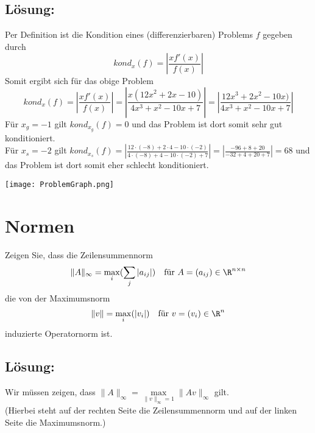 \subsection*{Lösung:}
Per Definition ist die Kondition eines (differenzierbaren) Problems $f$ gegeben durch
$$
kond_x(f)=\left|\frac{xf'(x)}{f(x)}\right|
$$
Somit ergibt sich für das obige Problem
$$
kond_x(f)=\left|\frac{xf'(x)}{f(x)}\right|=\left|\frac{x(12x^2+2x-10)}{4x^3+x^2-10x+7}\right|=\left|\frac{12x^3+2x^2-10x)}{4x^3+x^2-10x+7}\right|
$$
Für $x_g=-1$ gilt $kond_{x_g}(f)=0$ und das Problem ist dort somit sehr gut konditioniert.\\ Für $x_s=-2$ gilt $kond_{x_s}(f)=\left|\frac{12\cdot(-8)+2\cdot4-10\cdot (-2)}{4\cdot (-8)+4-10\cdot(-2)+7}\right|=\left|\frac{-96+8+20}{-32+4+20+7}\right|=68$ und das Problem ist dort somit eher schlecht konditioniert.\\
\begin{center}
\texttt{[image: ProblemGraph.png]}
\end{center}
\newpage

\section{Normen}
Zeigen Sie, dass die Zeilensummennorm 
$$
\|A\|_\infty = \max_i(\sum_j |a_{ij}|) \quad \text{für} \ A=(a_{ij}) \in \R^{n\times n}
$$
die von der Maximumsnorm
$$
\|v\|= \max_i(|v_i|) \quad \text{für} \ v=(v_i) \in \R^n
$$
induzierte Operatornorm ist.

\subsection*{Lösung:}
Wir müssen zeigen, dass $\|A\|_\infty=\max \limits_{\|v\|_\infty=1} \|Av\|_\infty$ gilt.\\ (Hierbei steht auf der rechten Seite die Zeilensummennorm und auf der linken Seite die Maximumsnorm.)\\


